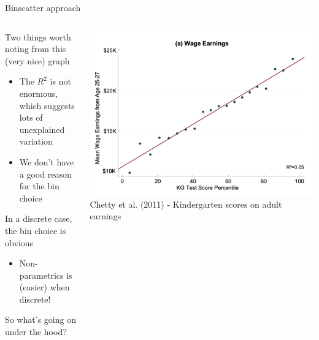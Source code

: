 \documentclass[notes,11pt, aspectratio=169]{beamer}
\newenvironment{wideitemize}{\itemize\addtolength{\itemsep}{10pt}}{\enditemize}
\begin{document}
\begin{frame}{Binscatter approach}
  \begin{columns}[T] %
    \begin{column}{.5\textwidth}
      \begin{wideitemize}
      \item Two things worth noting from this (very nice) graph
        \begin{itemize}
        \item The $R^2$ is not enormous, which suggests lots of unexplained variation
        \item We don't have a good reason for the bin choice
        \end{itemize}
      \item In a discrete case, the bin choice is obvious
        \begin{itemize}
        \item Non-parametrics is (easier) when discrete!
        \end{itemize}
      \item So what's going on under the hood?
  \end{wideitemize}
  \end{column}%
  \hfill%
  \begin{column}{.5\textwidth}
\includegraphics[width=\linewidth]{first_binscatter.png}
Chetty et al. (2011) - Kindergarten scores on adult earnings
  \end{column}
\end{columns}
\end{frame}
\end{document}
